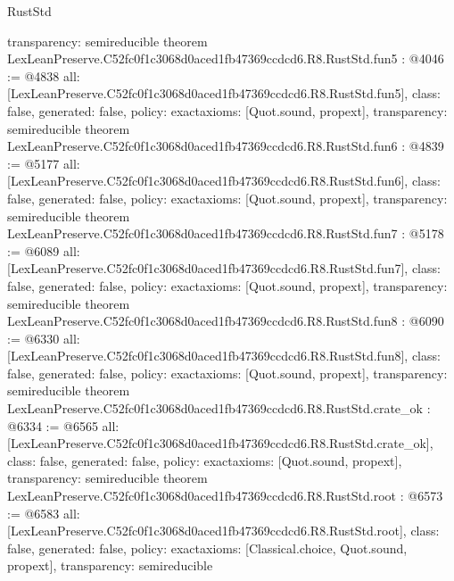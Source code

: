 \begin{lexlean}{RustStd}
\begin{coremodule}
{  transparency: semireducible
}
theorem LexLeanPreserve.C52fc0f1c3068d0aced1fb47369ccdcd6.R8.RustStd.fun5 : @4046 := @4838 {
  all: [LexLeanPreserve.C52fc0f1c3068d0aced1fb47369ccdcd6.R8.RustStd.fun5],
  class: false,
  generated: false,
  policy: exact{axioms: [Quot.sound, propext]},
  transparency: semireducible
}
theorem LexLeanPreserve.C52fc0f1c3068d0aced1fb47369ccdcd6.R8.RustStd.fun6 : @4839 := @5177 {
  all: [LexLeanPreserve.C52fc0f1c3068d0aced1fb47369ccdcd6.R8.RustStd.fun6],
  class: false,
  generated: false,
  policy: exact{axioms: [Quot.sound, propext]},
  transparency: semireducible
}
theorem LexLeanPreserve.C52fc0f1c3068d0aced1fb47369ccdcd6.R8.RustStd.fun7 : @5178 := @6089 {
  all: [LexLeanPreserve.C52fc0f1c3068d0aced1fb47369ccdcd6.R8.RustStd.fun7],
  class: false,
  generated: false,
  policy: exact{axioms: [Quot.sound, propext]},
  transparency: semireducible
}
theorem LexLeanPreserve.C52fc0f1c3068d0aced1fb47369ccdcd6.R8.RustStd.fun8 : @6090 := @6330 {
  all: [LexLeanPreserve.C52fc0f1c3068d0aced1fb47369ccdcd6.R8.RustStd.fun8],
  class: false,
  generated: false,
  policy: exact{axioms: [Quot.sound, propext]},
  transparency: semireducible
}
theorem LexLeanPreserve.C52fc0f1c3068d0aced1fb47369ccdcd6.R8.RustStd.crate_ok : @6334 := @6565 {
  all: [LexLeanPreserve.C52fc0f1c3068d0aced1fb47369ccdcd6.R8.RustStd.crate_ok],
  class: false,
  generated: false,
  policy: exact{axioms: [Quot.sound, propext]},
  transparency: semireducible
}
theorem LexLeanPreserve.C52fc0f1c3068d0aced1fb47369ccdcd6.R8.RustStd.root : @6573 := @6583 {
  all: [LexLeanPreserve.C52fc0f1c3068d0aced1fb47369ccdcd6.R8.RustStd.root],
  class: false,
  generated: false,
  policy: exact{axioms: [Classical.choice, Quot.sound, propext]},
  transparency: semireducible
}


\end{coremodule}
\end{lexlean}
